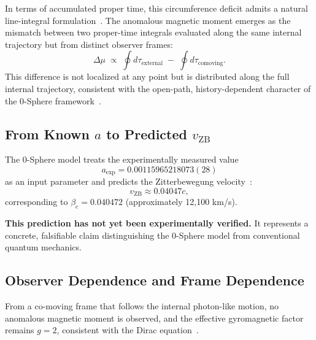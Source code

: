 \documentclass[12pt,letterpaper]{article}
\begin{document}
In terms of accumulated proper time, this circumference deficit admits a natural line-integral formulation~\cite{hanamura18203433}. The anomalous magnetic moment emerges as the mismatch between two proper-time integrals evaluated along the same internal trajectory but from distinct observer frames:
\begin{equation}
\Delta \mu \;\propto\; \oint d\tau_{\text{external}} \;-\; \oint d\tau_{\text{comoving}}.
\end{equation}
This difference is not localized at any point but is distributed along the full internal trajectory, consistent with the open-path, history-dependent character of the 0-Sphere framework~\cite{hanamura18203433}.

\subsection{From Known $a$ to Predicted $v_{\mathrm{ZB}}$}

The 0-Sphere model treats the experimentally measured value
\begin{equation}
a_{\mathrm{exp}} = 0.00115965218073(28)
\end{equation}
as an input parameter and predicts the Zitterbewegung velocity~\cite{hanamura18356895}:
\begin{equation}
v_{\mathrm{ZB}} \approx 0.04047c,
\end{equation}
corresponding to $\beta_e = 0.040472$ (approximately 12,100 km/s).

\textbf{This prediction has not yet been experimentally verified.} It represents a concrete, falsifiable claim distinguishing the 0-Sphere model from conventional quantum mechanics.

\subsection{Observer Dependence and Frame Dependence}

From a co-moving frame that follows the internal photon-like motion, no anomalous magnetic moment is observed, and the effective gyromagnetic factor remains $g = 2$, consistent with the Dirac equation~\cite{Dirac1928,hanamura17765409}.
\end{document}
